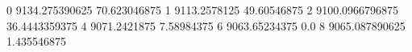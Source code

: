 0 9134.275390625 70.623046875
1 9113.2578125 49.60546875
2 9100.0966796875 36.4443359375
4 9071.2421875 7.58984375
6 9063.65234375 0.0
8 9065.087890625 1.435546875
